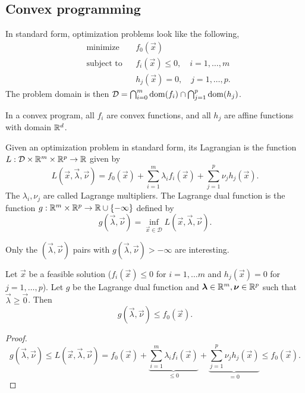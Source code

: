 \subsection{Convex programming}

In standard form, optimization problems look like the following, \[
    \begin{aligned}
         & \text{minimize}   &  & f_0(\vec{x})                                 \\
         & \text{subject to} &  & f_i(\vec{x}) \leq 0, \quad i = 1,\ldots,m    \\
         &                   &  & h_j(\vec{x}) = 0,    \quad j = 1, \ldots, p.
    \end{aligned}
\]
The problem domain is then $\mathcal{D} = \bigcap_{i=0}^m \mathrm{dom}(f_i) \cap \bigcap_{j=1}^p
    \mathrm{dom}(h_j)$.

In a convex program, all $f_i$ are convex functions, and all $h_j$ are affine functions with domain
$\mathbb{R}^d$.

\begin{definition}
    Given an optimization problem in standard form, its Lagrangian is the function $L: \mathcal{D} \times \mathbb{R}^m \times \mathbb{R}^p \to \mathbb{R}$ given by \[
        L(\vec{x},\vec{\lambda},\vec{\nu}) = f_0(\vec{x}) + \sum_{i=1}^{m} \lambda_i f_i(\vec{x}) + \sum_{j=1}^{p} \nu_j h_j(\vec{x}).
    \]
    The $\lambda_i,\nu_j$ are called Lagrange multipliers. The Lagrange dual function is the function
    $g: \mathbb{R}^m \times \mathbb{R}^p \to \mathbb{R} \cup \{ -\infty \}$ defined by \[
        g(\vec{\lambda},\vec{\nu}) = \inf_{\vec{x}\in \mathcal{D}} L(\vec{x},\vec{\lambda},\vec{\nu}).
    \]
\end{definition}

Only the $(\vec{\lambda},\vec{\nu})$ pairs with $g(\vec{\lambda},\vec{\nu}) > -\infty$ are
interesting.

\begin{lemma}
    Let $\vec{x}$ be a feasible solution ($f_i(\vec{x}) \leq 0$ for $i=1,\ldots m$ and $h_j(\vec{x}) = 0$ for $j=1,\ldots,p$). Let $g$ be the Lagrange dual function and $\bm{\lambda}\in \mathbb{R}^m, \bm{\nu}\in \mathbb{R}^p$ such that $\vec{\lambda} \geq \vec{0}$. Then \[
        g(\vec{\lambda},\vec{\nu}) \leq f_0(\vec{x}).
    \]
\end{lemma}

\begin{proof}
    \[
        g(\vec{\lambda},\vec{\nu}) \leq L(\vec{x},\vec{\lambda},\vec{\nu}) = f_0(\vec{x}) + \underbrace{\sum_{i=1}^{m} \lambda_i f_i(\vec{x})}_{\leq 0} + \underbrace{\sum_{j=1}^{p} \nu_j h_j(\vec{x})}_{=0} \leq f_0(\vec{x}).
    \]
\end{proof}

